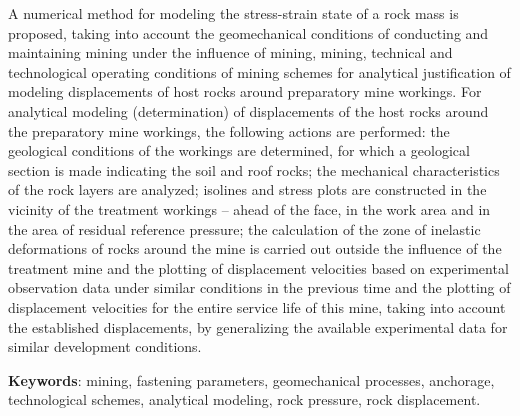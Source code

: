 A numerical method for modeling the stress-strain state of a rock mass
is proposed, taking into account the geomechanical conditions of
conducting and maintaining mining under the influence of mining, mining,
technical and technological operating conditions of mining schemes for
analytical justification of modeling displacements of host rocks around
preparatory mine workings. For analytical modeling (determination) of
displacements of the host rocks around the preparatory mine workings,
the following actions are performed: the geological conditions of the
workings are determined, for which a geological section is made
indicating the soil and roof rocks; the mechanical characteristics of
the rock layers are analyzed; isolines and stress plots are constructed
in the vicinity of the treatment workings -- ahead of the face, in the
work area and in the area of residual reference pressure; the
calculation of the zone of inelastic deformations of rocks around the
mine is carried out outside the influence of the treatment mine and the
plotting of displacement velocities based on experimental observation
data under similar conditions in the previous time and the plotting of
displacement velocities for the entire service life of this mine, taking
into account the established displacements, by generalizing the
available experimental data for similar development conditions.

{\bfseries Keywords}: mining, fastening parameters, geomechanical
processes, anchorage, technological schemes, analytical modeling, rock
pressure, rock displacement.

